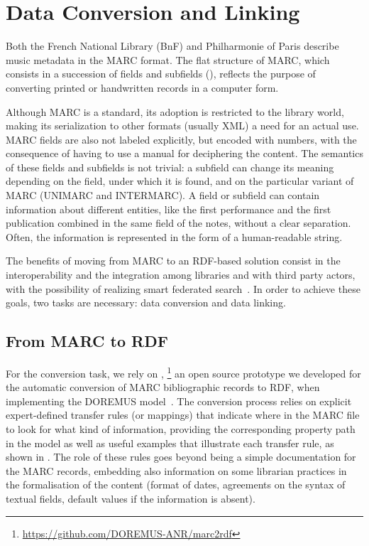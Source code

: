 
\section{Data Conversion and Linking}
\label{sec:conversion-linking}
Both the French National Library (BnF) and Philharmonie of Paris describe music metadata in the MARC format. The flat structure of MARC, which consists in a succession of fields and subfields (), reflects the purpose of converting printed or handwritten records in a computer form.

Although MARC is a standard, its adoption is restricted to the library world, making its serialization to other formats (usually XML) a need for an actual use. MARC fields are also not labeled explicitly, but encoded with numbers, with the consequence of having to use a manual for deciphering the content. The semantics of these fields and subfields is not trivial: a subfield can change its meaning depending on the field, under which it is found, and on the particular variant of MARC (UNIMARC and INTERMARC). A field or subfield can contain information about different entities, like the first performance and the first publication combined in the same field of the notes, without a clear separation. Often, the information is represented in the form of a human-readable string.
\cite{tennant2002marc}

The benefits of moving from MARC to an RDF-based solution consist in the interoperability and the integration among libraries and with third party actors, with the possibility of realizing smart federated search~\cite{byrne2010strongest, alemu2012linked}. In order to achieve these goals, two tasks are necessary: data conversion and data linking.

\subsection{From MARC to RDF}
For the conversion task, we rely on , \footnote{\url{https://github.com/DOREMUS-ANR/marc2rdf}} an open source prototype we developed for the automatic conversion of MARC bibliographic records to RDF, when implementing the DOREMUS model~\cite{lisena2016exploring}. The conversion process relies on explicit expert-defined transfer rules (or mappings) that indicate where in the MARC file to look for what kind of information, providing the corresponding property path in the model as well as useful examples that illustrate each transfer rule, as shown in . The role of these rules goes beyond being a simple documentation for the MARC records, embedding also information on some librarian practices in the formalisation of the content (format of dates, agreements on the syntax of textual fields, default values if the information is absent).

